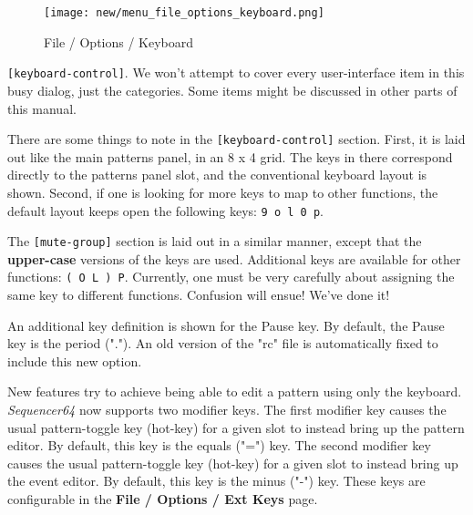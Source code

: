 \begin{figure}[H]
   \centering 
   \texttt{[image: new/menu\_file\_options\_keyboard.png]}
   \caption{File / Options / Keyboard}
   \label{fig:seq64_menu_file_options_keyboard}
\end{figure}

   \texttt{[keyboard-control]}.
   We won't attempt to cover every user-interface item in this busy
   dialog, just the categories.  Some items might be discussed in other parts
   of this manual.

   There are some things to note in the \texttt{[keyboard-control]} section.
   First, it is laid out like the main patterns panel, in an 8 x 4 grid.
   The keys in there correspond directly to the patterns panel slot, and the
   conventional keyboard layout is shown.
   Second, if one is looking for more keys to map to other functions, the
   default layout keeps open the following keys:
   \texttt{9 o l 0 p}.

   The \texttt{[mute-group]} section is laid out in a similar manner, except
   that the \textbf{upper-case} versions of the keys are used.  Additional keys
   are available for other functions:
   \texttt{( O L ) P}.
   Currently, one must be very carefully about assigning the same key to
   different functions.  Confusion will ensue!  We've done it!

   An additional key definition is shown for the Pause key.
   By default, the Pause key is the period (".").  An old version of
   the "rc" file is automatically fixed to include this new option.


   New features try to achieve being able to edit a pattern using only the
   keyboard.  \textsl{Sequencer64} now supports two modifier keys.
   The first modifier key causes the usual pattern-toggle key (hot-key) for a
   given slot to instead bring up the pattern editor.  By default, this key is
   the equals ("=") key.
   The second modifier key causes the usual
   pattern-toggle key (hot-key) for a given slot to instead bring up the event
   editor.  By default, this key is the minus ("-") key.
   These keys are configurable in the
   \textbf{File / Options / Ext Keys} page.

